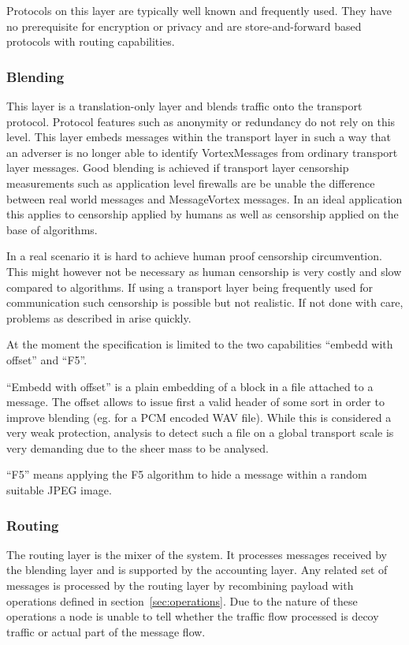 \documentclass[9pt,journal,compsoc]{IEEEtran}
\begin{document}
Protocols on this layer are typically well known and frequently used. They have no prerequisite for encryption or privacy and are store-and-forward based protocols with routing capabilities. 

\subsubsection{Blending}
This layer is a translation-only layer and blends traffic onto the transport protocol. Protocol features such as anonymity or redundancy do not rely on this level. This layer embeds messages within the transport layer in such a way that an adverser is no longer able to identify VortexMessages from ordinary transport layer messages. Good blending is achieved if transport layer censorship measurements such as application level firewalls are be unable the difference between real world messages and MessageVortex messages. In an ideal application this applies to censorship applied by humans as well as censorship applied on the base of algorithms. 

In a real scenario it is hard to achieve human proof censorship circumvention. This might however not be necessary as human censorship is very costly and slow compared to algorithms. If using a transport layer being frequently used for communication such censorship is possible but not realistic. If not done with care, problems as described in \cite{abadi2005moderately} arise quickly. 

At the moment the specification is limited to the two capabilities ``embedd with offset'' and ``F5''. 

``Embedd with offset'' is a plain embedding of a block in a file attached to a message. The offset allows to issue first a valid header of some sort in order to improve blending (eg. for a PCM encoded WAV file). While this is considered a very weak protection, analysis to detect such a file on a global transport scale is very demanding due to the sheer mass to be analysed. 

``F5'' means applying the F5 algorithm to hide a message within a random suitable JPEG image.

\subsubsection{Routing}
The routing layer is the mixer of the system. It processes messages received by the blending layer and is supported by the accounting layer. Any related set of messages is processed by the routing layer by recombining payload with operations defined in section~\ref{sec:operations}. Due to the nature of these operations a node is unable to tell whether the traffic flow processed is decoy traffic or actual part of the message flow.
\end{document}
